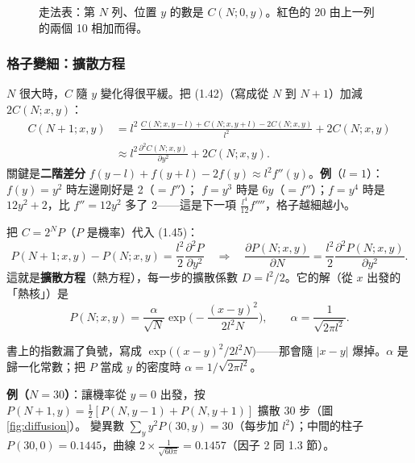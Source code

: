 \begin{figure}[H]
\centering
\FigPascal
\caption{走法表：第 $N$ 列、位置 $y$ 的數是 $C(N;0,y)$。紅色的 20 由上一列的兩個 10 相加而得。}
\label{fig:pascal}
\end{figure}

\subsubsection*{格子變細：擴散方程}
$N$ 很大時，$C$ 隨 $y$ 變化得很平緩。把 (1.42)（寫成從 $N$ 到 $N+1$）加減 $2C(N;x,y)$：
\begin{equation}
\begin{aligned}
C(N+1;x,y)&=l^2\,\frac{C(N;x,y-l)+C(N;x,y+l)-2C(N;x,y)}{l^2}+2C(N;x,y)\\
&\approx l^2\frac{\partial^2C(N;x,y)}{\partial y^2}+2C(N;x,y).
\end{aligned} \tag{1.44}
\end{equation}
關鍵是\textbf{二階差分} $f(y-l)+f(y+l)-2f(y)\approx l^2f''(y)$。\textbf{例}（$l=1$）：$f(y)=y^2$ 時左邊剛好是 2（$=f''$）；
$f=y^3$ 時是 $6y$（$=f''$）；$f=y^4$ 時是 $12y^2+2$，比 $f''=12y^2$ 多了 2——這是下一項 $\frac{l^4}{12}f''''$，格子越細越小。

把 $C=2^NP$（$P$ 是機率）代入 (1.45)：
\begin{equation}
P(N+1;x,y)-P(N;x,y)=\frac{l^2}{2}\frac{\partial^2P}{\partial y^2}
\quad\Longrightarrow\quad
\frac{\partial P(N;x,y)}{\partial N}=\frac{l^2}{2}\frac{\partial^2P(N;x,y)}{\partial y^2}. \tag{1.46--1.47}
\end{equation}
這就是\textbf{擴散方程}（熱方程），每一步的擴散係數 $D=l^2/2$。它的解（從 $x$ 出發的「熱核」）是
\begin{equation}
P(N;x,y)=\frac{\alpha}{\sqrt N}\exp\Big(-\frac{(x-y)^2}{2l^2N}\Big),\qquad\alpha=\frac{1}{\sqrt{2\pi l^2}}. \tag{1.48}
\end{equation}

\begin{errbox}[p.~14，(1.48)]
書上的指數漏了負號，寫成 $\exp\big((x-y)^2/2l^2N\big)$——那會隨 $|x-y|$ 爆掉。$\alpha$ 是歸一化常數；把 $P$ 當成 $y$ 的密度時 $\alpha=1/\sqrt{2\pi l^2}$。
\end{errbox}

\textbf{例（$N=30$）}：讓機率從 $y=0$ 出發，按 $P(N+1,y)=\frac12[P(N,y-1)+P(N,y+1)]$ 擴散 30 步（圖 \ref{fig:diffusion}）。
變異數 $\sum_yy^2P(30,y)=30$（每步加 $l^2$）；中間的柱子 $P(30,0)=0.1445$，曲線 $2\times\frac1{\sqrt{60\pi}}=0.1457$（因子 2 同 1.3 節）。

